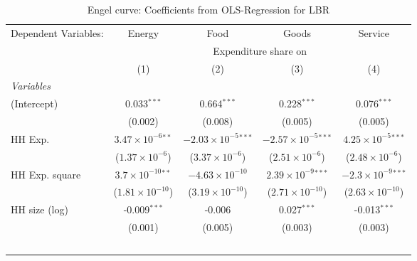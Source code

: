 
\begin{table}[htbp!]
   \centering
   \small
   \begin{adjustbox}{width = 1\textwidth, max height = 0.95\textheight, center}
      \begin{threeparttable}[b]
         \caption{\label{tab:Engel_parametric_LBR} Engel curve: Coefficients from OLS-Regression for LBR}
         \begin{tabular}{lcccc}
            \tabularnewline \midrule \midrule
            Dependent Variables: & Energy                       & Food                           & Goods                          & Service\\  
             & \multicolumn{4}{c}{Expenditure share on} \\ 
                                 & (1)                          & (2)                            & (3)                            & (4)\\  
            \midrule
            \emph{Variables}\\
            (Intercept)          & 0.033$^{***}$                & 0.664$^{***}$                  & 0.228$^{***}$                  & 0.076$^{***}$\\   
                                 & (0.002)                      & (0.008)                        & (0.005)                        & (0.005)\\   
            HH Exp.              & $3.47\times 10^{-6}$$^{**}$  & $-2.03\times 10^{-5}$$^{***}$  & $-2.57\times 10^{-5}$$^{***}$  & $4.25\times 10^{-5}$$^{***}$\\    
                                 & ($1.37\times 10^{-6}$)       & ($3.37\times 10^{-6}$)         & ($2.51\times 10^{-6}$)         & ($2.48\times 10^{-6}$)\\    
            HH Exp. square       & $3.7\times 10^{-10}$$^{**}$  & $-4.63\times 10^{-10}$         & $2.39\times 10^{-9}$$^{***}$   & $-2.3\times 10^{-9}$$^{***}$\\    
                                 & ($1.81\times 10^{-10}$)      & ($3.19\times 10^{-10}$)        & ($2.71\times 10^{-10}$)        & ($2.63\times 10^{-10}$)\\    
            HH size (log)        & -0.009$^{***}$               & -0.006                         & 0.027$^{***}$                  & -0.013$^{***}$\\   
                                 & (0.001)                      & (0.005)                        & (0.003)                        & (0.003)\\   
$$
\end{tabular}
\end{threeparttable}
\end{adjustbox}
\end{table}
